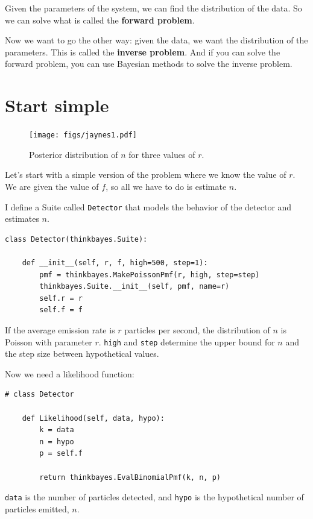 \documentclass[12pt]{book}
\begin{document}
Given the parameters of the system, we can find the distribution of
the data.  So we can solve what is called the {\bf forward problem}.

Now we want to go the other way: given the data, we
want the distribution of the parameters.  This is called
the {\bf inverse problem}.  And if you can solve the forward
problem, you can use Bayesian methods to solve the inverse problem.


\section{Start simple}

\begin{figure}
\centerline{\texttt{[image: figs/jaynes1.pdf]}}
\caption{Posterior distribution of $n$ for three values of $r$.}
\label{fig.jaynes1}
\end{figure}

Let's start with a simple version of the problem where we know
the value of $r$.  We are given the value of $f$, so all we
have to do is estimate $n$.

I define a Suite called {\tt Detector} that models the behavior
of the detector and estimates $n$.

\begin{verbatim}
class Detector(thinkbayes.Suite):

    def __init__(self, r, f, high=500, step=1):
        pmf = thinkbayes.MakePoissonPmf(r, high, step=step)
        thinkbayes.Suite.__init__(self, pmf, name=r)
        self.r = r
        self.f = f
\end{verbatim}

If the average emission rate is $r$ particles per second, the
distribution of $n$ is Poisson with parameter $r$.
{\tt high} and {\tt step} determine the upper bound for $n$
and the step size between hypothetical values.

Now we need a likelihood function:

\begin{verbatim}
# class Detector

    def Likelihood(self, data, hypo):
        k = data
        n = hypo
        p = self.f

        return thinkbayes.EvalBinomialPmf(k, n, p)
\end{verbatim}

{\tt data} is the number of particles detected, and {\tt hypo} is
the hypothetical number of particles emitted, $n$.
\end{document}
